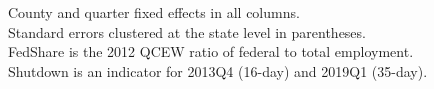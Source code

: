 \begin{table}[htbp]
   \par \raggedright 
   County and quarter fixed effects in all columns.\\
   Standard errors clustered at the state level in parentheses.\\
   FedShare is the 2012 QCEW ratio of federal to total employment.\\
   Shutdown is an indicator for 2013Q4 (16-day) and 2019Q1 (35-day).
\end{table}



